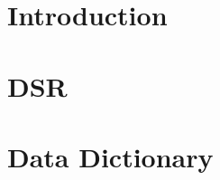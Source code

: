 \documentclass{report}
\begin{document}
\chapter{Introduction}


\chapter{DSR}


\chapter{Data Dictionary}

\end{document}
